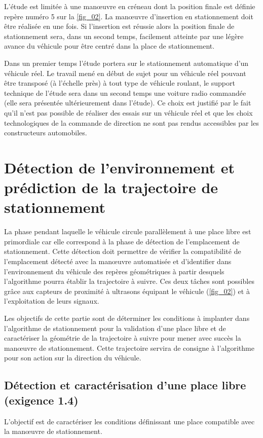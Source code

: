 L’étude est limitée à une manœuvre en créneau dont la position finale est définie repère numéro 5 sur la \autoref{fig_02}.
La manœuvre d’insertion en stationnement doit être réalisée en une fois. Si l’insertion est réussie alors la position
finale de stationnement sera, dans un second temps, facilement atteinte par une légère avance du véhicule pour
être centré dans la place de stationnement.

Dans un premier temps l’étude portera sur le stationnement automatique d’un véhicule réel. Le travail mené en
début de sujet pour un véhicule réel pouvant être transposé (à l’échelle près) à tout type de véhicule roulant,
le support technique de l’étude sera dans un second temps une voiture radio commandée (elle sera présentée
ultérieurement dans l’étude). Ce choix est justifié par le fait qu’il n’est pas possible de réaliser des essais sur un
véhicule réel et que les choix technologiques de la commande de direction ne sont pas rendus accessibles par les
constructeurs automobiles.


\section{Détection de l’environnement et prédiction de la trajectoire de
stationnement}

La phase pendant laquelle le véhicule circule parallèlement à une place libre est primordiale car elle correspond
à la phase de détection de l’emplacement de stationnement. Cette détection doit permettre de vérifier la compatibilité de l’emplacement détecté avec la manœuvre automatisée et d’identifier dans l’environnement du véhicule
des repères géométriques à partir desquels l’algorithme pourra établir la trajectoire à suivre.
Ces deux tâches sont possibles grâce aux capteurs de proximité à ultrasons équipant le véhicule (\autoref{fig_02}) et à
l’exploitation de leurs signaux.

\begin{obj}
Les objectifs de cette partie sont de déterminer les conditions à implanter dans l’algorithme de stationnement pour la validation d’une place libre et de caractériser la géométrie de la trajectoire à
suivre pour mener avec succès la manœuvre de stationnement. Cette trajectoire servira de consigne à
l’algorithme pour son action sur la direction du véhicule.
\end{obj}

\subsection{Détection et caractérisation d’une place libre (exigence 1.4)}
\begin{obj}
L’objectif est de caractériser les conditions définissant une place compatible avec la manœuvre de
stationnement.
\end{obj}

